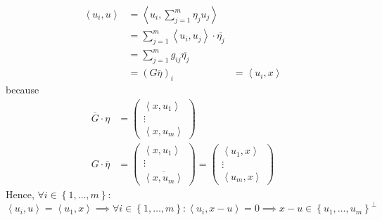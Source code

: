 \documentclass{article}
\newcommand{\set}[1]{\left\{#1\right\}}
\newcommand{\ip}[2]{\left\langle#1,#2\right\rangle} %
\begin{document}
\begin{align*}
  \ip{u_i}{u} &= \ip{u_i}{\sum_{j=1}^m \eta_j u_j} \\
    &= \sum_{j=1}^m \ip{u_i}{u_j} \cdot \overline{\eta_j} \\
    &= \sum_{j=1}^m g_{ij} \overline{\eta_j} \\
    &= (G \overline{\eta})_i
    &= \ip{u_i}{x}
\end{align*}
because
\begin{align*}
  \overline G \cdot \eta &= \begin{pmatrix} \ip{x}{u_1} \\ \vdots \\ \ip{x}{u_m} \end{pmatrix} \\
  G \cdot \overline \eta &= \begin{pmatrix} \ip{x}{u_1} \\ \vdots \\ \overline{\ip{x}{u_m}} \end{pmatrix} = \begin{pmatrix} \ip{u_1}{x} \\ \vdots \\ \ip{u_m}{x} \end{pmatrix}
\end{align*}
Hence, $\forall i \in \set{1, \ldots, m}$:
\[ \ip{u_i}{u} = \ip{u_1}{x} \implies \forall i \in \set{1, \ldots, m}: \ip{u_i}{x - u} = 0 \implies x - u \in \set{u_1, \ldots, u_m}^\bot \]
\end{document}
